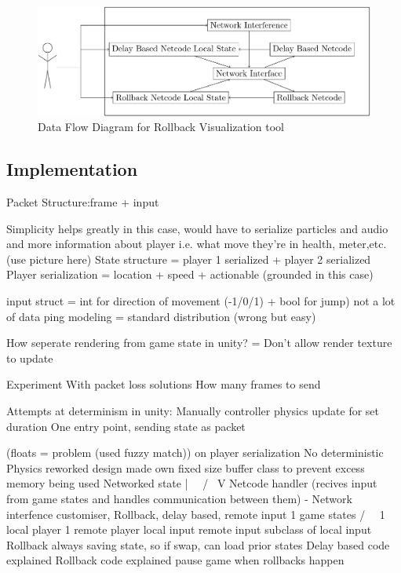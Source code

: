 \documentclass{entcs}
\begin{document}
\begin{figure}[h]
\centering
\includegraphics[width=\textwidth]{UIDesign}
\caption{Data Flow Diagram for Rollback Visualization tool}
\label{fig:DFD}
\end{figure}

\subsection{Implementation}

Packet Structure:frame + input

Simplicity helps greatly in this case, would have to serialize particles and audio and more information about player i.e. what move they're in health, meter,etc. (use picture here)
State structure = player 1 serialized + player 2 serialized
Player serialization = location + speed + actionable (grounded in this case)

input struct = int for direction of movement (-1/0/1) + bool for jump) not a lot of data
 ping modeling = standard distribution (wrong but easy)

How seperate rendering from game state in unity? = Don't allow render texture to update

Experiment With packet loss solutions
How many frames to send

Attempts at determinism in unity:
Manually controller physics update for set duration 
One entry point, sending state as packet

(floats = problem (used fuzzy match)) on player serialization
No deterministic Physics
reworked design
made own fixed size buffer class to prevent excess memory being used
Networked state
 |                  \
\ /                  \
 V                    Netcode handler (recives input from game states and handles communication between them) - Network interfence customiser, Rollback, delay based, remote input
1 game states              
/             \                        \
1 local player   1 remote player        local input
 remote input subclass of local input
Rollback always saving state, so if swap, can load prior states
Delay based code explained
Rollback code explained
pause game when rollbacks happen
\end{document}
